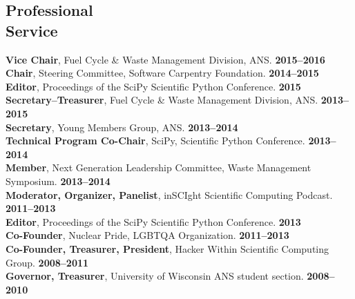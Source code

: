 \documentclass[margin,line]{resume}
\begin{document}
\begin{resume}
    \section{\mysidestyle Professional\\Service}
		\textbf{Vice Chair}, Fuel Cycle \& Waste Management Division, ANS. \hfill \textbf{2015--2016}\vspace{.5mm}\\%
		\textbf{Chair}, Steering Committee, Software Carpentry Foundation.  \hfill \textbf{2014--2015}\vspace{.5mm}\\%
		\textbf{Editor}, Proceedings of the SciPy Scientific Python Conference.  \hfill \textbf{2015}\vspace{.5mm}\\%
		\textbf{Secretary--Treasurer}, Fuel Cycle \& Waste Management Division, ANS. \hfill \textbf{2013--2015}\vspace{.5mm}\\%
		\textbf{Secretary}, Young Members Group, ANS. \hfill \textbf{2013--2014}\vspace{.5mm}\\%
		\textbf{Technical Program Co-Chair}, SciPy, Scientific Python Conference.  \hfill \textbf{2013--2014}\vspace{.5mm}\\%
		\textbf{Member}, Next Generation Leadership Committee, Waste Management Symposium. \hfill \textbf{2013--2014}\vspace{.5mm}\\%
		\textbf{Moderator, Organizer, Panelist}, inSCIght Scientific Computing Podcast. \hfill \textbf{2011--2013}\vspace{.5mm}\\%
		\textbf{Editor}, Proceedings of the SciPy Scientific Python Conference.  \hfill \textbf{2013}\vspace{.5mm}\\%
		\textbf{Co-Founder}, Nuclear Pride, LGBTQA Organization. \hfill \textbf{2011--2013}\vspace{.5mm}\\%
		\textbf{Co-Founder, Treasurer, President}, Hacker Within Scientific Computing Group. \hfill \textbf{2008--2011}\vspace{.5mm}\\%
		\textbf{Governor, Treasurer}, University of Wisconsin ANS student section. \hfill \textbf{2008--2010}\vspace{.5mm}\\%


\end{resume}
\end{document}
